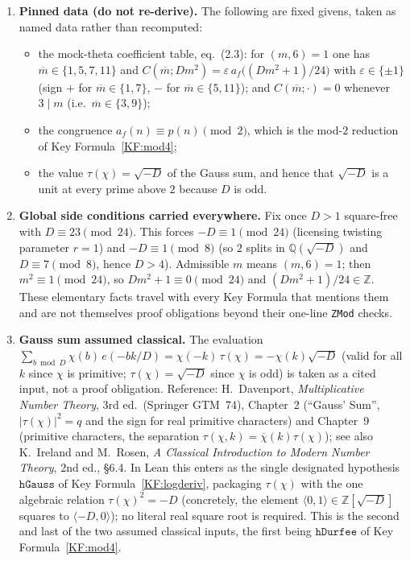 \documentclass[11pt]{article}
\newcommand{\Z}{\mathbb{Z}}
\newcommand{\Q}{\mathbb{Q}}
\theoremstyle{definition}
\begin{document}
\begin{enumerate}
\item[(C4)] \textbf{Pinned data (do not re-derive).} The following are fixed givens, taken as
named data rather than recomputed:
\begin{itemize}
\item the mock-theta coefficient table, eq.~(2.3): for $(m,6)=1$ one has $\overline m\in\{1,5,7,11\}$
and $C(\overline m;Dm^2)=\varepsilon\,a_f\bigl((Dm^2+1)/24\bigr)$ with $\varepsilon\in\{\pm1\}$
(sign $+$ for $\overline m\in\{1,7\}$, $-$ for $\overline m\in\{5,11\}$); and $C(\overline m;\cdot)=0$
whenever $3\mid m$ (i.e.\ $\overline m\in\{3,9\}$);
\item the congruence $a_f(n)\equiv p(n)\pmod2$, which is the mod-$2$ reduction of
Key Formula~\ref{KF:mod4};
\item the value $\tau(\chi)=\sqrt{-D}$ of the Gauss sum, and hence that $\sqrt{-D}$ is a unit at
every prime above $2$ because $D$ is odd.
\end{itemize}

\item[(C5)] \textbf{Global side conditions carried everywhere.} Fix once $D>1$ square-free with
$D\equiv23\pmod{24}$. This forces $-D\equiv1\pmod{24}$ (licensing twisting parameter $r=1$) and
$-D\equiv1\pmod8$ (so $2$ splits in $\Q(\sqrt{-D})$ and $D\equiv7\pmod8$, hence $D>4$). Admissible
$m$ means $(m,6)=1$; then $m^2\equiv1\pmod{24}$, so $Dm^2+1\equiv0\pmod{24}$ and $(Dm^2+1)/24\in\Z$.
These elementary facts travel with every Key Formula that mentions them and are not themselves
proof obligations beyond their one-line \texttt{ZMod} checks.

\item[(C6)] \textbf{Gauss sum assumed classical.} The evaluation
$\sum_{b\bmod D}\chi(b)\,e(-bk/D)=\chi(-k)\,\tau(\chi)=-\chi(k)\sqrt{-D}$ (valid for all $k$ since
$\chi$ is primitive; $\tau(\chi)=\sqrt{-D}$ since $\chi$ is odd) is taken as a cited input, not a
proof obligation. Reference: H.~Davenport, \emph{Multiplicative Number Theory}, 3rd ed.\ (Springer
GTM~74), Chapter~2 (``Gauss' Sum'', $|\tau(\chi)|^2=q$ and the sign for real primitive characters)
and Chapter~9 (primitive characters, the separation $\tau(\chi,k)=\overline{\chi}(k)\tau(\chi)$);
see also K.~Ireland and M.~Rosen, \emph{A Classical Introduction to Modern Number Theory}, 2nd
ed., \S6.4. In Lean this enters as the single designated hypothesis $\mathtt{hGauss}$ of
Key Formula~\ref{KF:logderiv}, packaging $\tau(\chi)$ with the one algebraic relation
$\tau(\chi)^2=-D$ (concretely, the element $\langle0,1\rangle\in\Z[\sqrt{-D}]$ squares to
$\langle-D,0\rangle$); no literal real square root is required. This is the second and last of the
two assumed classical inputs, the first being $\mathtt{hDurfee}$ of Key Formula~\ref{KF:mod4}.


\end{enumerate}
\end{document}
